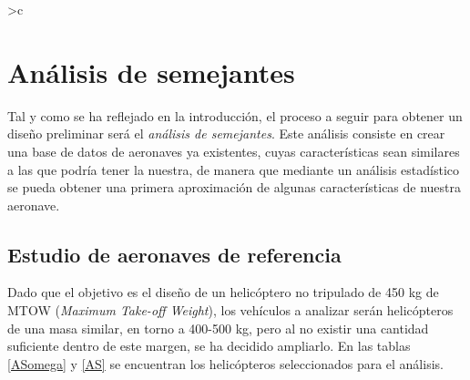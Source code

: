\newcolumntype{g} {>{}c}
\chapter{Análisis de semejantes}

Tal y como se ha reflejado en la introducción, el proceso a seguir para obtener un diseño preliminar será el \emph{análisis de semejantes}.
Este análisis consiste en crear una base de datos de aeronaves ya existentes, cuyas características sean similares a las que podría tener la nuestra, de manera que mediante un análisis estadístico se pueda obtener una primera aproximación de algunas características de nuestra aeronave.

\section{Estudio de aeronaves de referencia}

Dado que el objetivo es el diseño de un helicóptero no tripulado de 450 kg de MTOW (\emph{Maximum Take-off Weight}), los vehículos a analizar serán helicópteros de una masa similar, en torno a 400-500 kg, pero al no existir una cantidad suficiente dentro de este margen, se ha decidido ampliarlo.
En las tablas \ref{ASomega} y \ref{AS} se encuentran los helicópteros seleccionados para el análisis.

